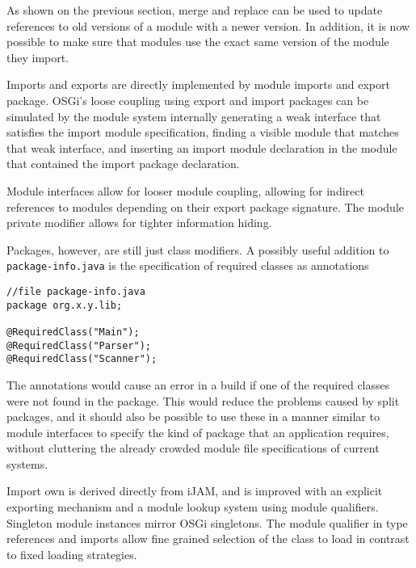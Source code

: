 As shown on the previous section, merge and replace can be used to 
update references to old versions of a module with a newer version.
In addition, it is now possible to make sure that modules use
the exact same version of the module they import.


Imports and exports are directly implemented by module imports and export package.
OSGi's loose coupling using export and import packages can be simulated by
the module system internally generating a weak interface that satisfies the import
module specification, finding a visible module that matches that weak interface, and
inserting an import module declaration in the module that contained the import package
declaration.

Module interfaces allow for looser module coupling, allowing for indirect 
references to modules depending on their export package signature. The module private
modifier allows for tighter information hiding.

Packages, however, are still just class modifiers. A possibly useful addition to 
\texttt{package-info.java} is the specification of required classes as annotations

\begin{lstlisting}
//file package-info.java
package org.x.y.lib;

@RequiredClass("Main");
@RequiredClass("Parser");
@RequiredClass("Scanner");
\end{lstlisting}

The annotations would cause an error in a build if one of the required classes were not
found in the package. This would reduce the problems caused by split packages, and it should
also be possible to use these in a manner similar to module interfaces to specify the kind
of package that an application requires, without cluttering the already crowded module
file specifications of current systems.


Import own is derived directly from iJAM, and is improved with an explicit exporting 
mechanism and a module lookup system using module qualifiers. Singleton module instances mirror
OSGi singletons. The module qualifier in type references and
imports allow fine grained selection of the class to load in contrast
to fixed loading strategies. 